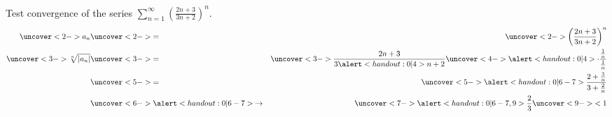 \begin{frame}
\begin{example} %
Test convergence of the series $\displaystyle \sum_{n=1}^\infty \left( \frac{2n + 3}{3n+2}\right)^n$.
\abovedisplayskip=0pt
\belowdisplayskip=0pt
\begin{eqnarray*}
\uncover<2->{%
a_n %
}%
 & \uncover<2->{=} & %
\uncover<2->{%
\left( \frac{2n+3}{3n+2}\right)^n%
}\\%
\uncover<3->{%
\sqrt[n]{\left| a_n\right|} %
}%
 & \uncover<3->{=} & %
\uncover<3->{%
\frac{2n+3}{3\alert<handout:0| 4>{n}+2}\uncover<4->{\alert<handout:0| 4>{\cdot \frac{\frac{1}{n}}{\frac{1}{n}}}}%
}\\%
 & \uncover<5->{=} & %
\uncover<5->{%
\alert<handout:0| 6-7>{%
\frac{2 + \frac{3}{n}}{3+\frac{2}{n}}%
}%
}\\%
 & \uncover<6->{\alert<handout:0| 6-7>{\to}} & %
\uncover<7->{%
\alert<handout:0| 6-7,9>{%
\frac{2}{3} \uncover<9->{ < 1 }
}%
}%
\end{eqnarray*}
%
\end{example}
\end{frame}
